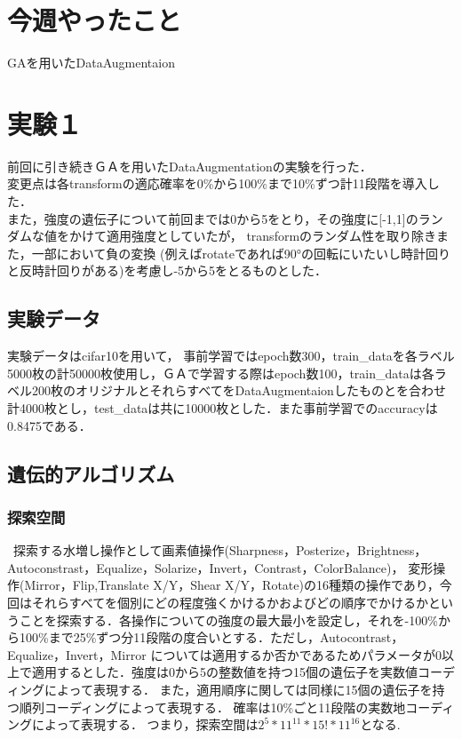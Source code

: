 \documentclass[twocolumn]{jarticle}     %
\begin{document}

\section{今週やったこと}
 GAを用いたDataAugmentaion

\section{実験１}
前回に引き続きＧＡを用いたDataAugmentationの実験を行った．\\
変更点は各transformの適応確率を0\%から100\%まで10\%ずつ計11段階を導入した．\\
また，強度の遺伝子について前回までは0から5をとり，その強度に[-1,1]のランダムな値をかけて適用強度としていたが，
transformのランダム性を取り除きまた，一部において負の変換
(例えばrotateであれば90°の回転にいたいし時計回りと反時計回りがある)を考慮し-5から5をとるものとした．


\subsection{実験データ}
実験データはcifar10を用いて，
事前学習ではepoch数300，train\_dataを各ラベル5000枚の計50000枚使用し，ＧＡで学習する際はepoch数100，train\_dataは各ラベル200枚のオリジナルとそれらすべてをDataAugmentaionしたものとを合わせ計4000枚とし，test\_dataは共に10000枚とした．また事前学習でのaccuracyは0.8475である．
\subsection{遺伝的アルゴリズム}


\subsubsection{探索空間}
\ 探索する水増し操作として画素値操作(Sharpness，Posterize，Brightness，Autoconstrast，Equalize，Solarize，Invert，Contrast，ColorBalance)，
変形操作(Mirror，Flip,Translate X/Y，Shear X/Y，Rotate)の16種類の操作であり，今回はそれらすべてを個別にどの程度強くかけるかおよびどの順序でかけるかということを探索する．各操作についての強度の最大最小を設定し，それを-100\%から100\%まで25\%ずつ分11段階の度合いとする．ただし，Autocontrast，Equalize，Invert，Mirror については適用するか否かであるためパラメータが0以上で適用するとした．強度は0から5の整数値を持つ15個の遺伝子を実数値コーディングによって表現する．
また，適用順序に関しては同様に15個の遺伝子を持つ順列コーディングによって表現する．
確率は10\%ごと11段階の実数地コーディングによって表現する．
つまり，探索空間は$2^5*11^{11}*15!*11^{16}$となる.
\end{document}
